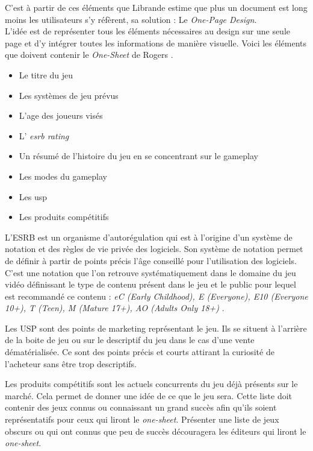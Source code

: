 C'est à partir de ces éléments que Librande \cite{onepage_librande} estime que plus un document est long moins les utilisateurs s'y réfèrent, sa solution : Le \emph{One-Page Design}.\\
L'idée est de représenter tous les éléments nécessaires au design sur une seule page et d'y intégrer toutes les informations de manière visuelle. 
Voici les éléments que doivent contenir le \emph{One-Sheet} de Rogers \cite{LevelUpRogers2014}.
\begin{itemize}
    \item Le titre du jeu
    \item Les systèmes de jeu prévus
    \item L'age des joueurs visés
\item L'\emph{ \gls{esrb} rating}
    \item Un résumé de l'histoire du jeu en se concentrant sur le gameplay
    \item Les modes du gameplay
    \item Les \gls{usp}
    \item Les produits compétitifs
\end{itemize}

L'ESRB est un organisme d'autorégulation qui est à l'origine d'un système de notation et des règles de vie privée des logiciels. Son système de notation permet de définir à partir de points précis l'âge conseillé pour l'utilisation des logiciels. C'est une notation que l'on retrouve systématiquement dans le domaine du jeu vidéo définissant le type de contenu présent dans le jeu et le public pour lequel est recommandé ce contenu : \emph{eC (Early Childhood), E (Everyone), E10 (Everyone 10+), T (Teen), M (Mature 17+), AO (Adults Only 18+)} .

Les USP sont des points de marketing représentant le jeu. Ils se situent à l'arrière de la boite de jeu ou sur le descriptif du jeu dans le cas d'une vente dématérialisée. Ce sont des points précis et courts attirant la curiosité de l'acheteur sans être trop descriptifs. 

Les produits compétitifs sont les actuels concurrents du jeu déjà présents sur le marché. Cela permet de donner une idée de ce que le jeu sera. Cette liste doit contenir des jeux connus ou connaissant un grand succès afin qu'ils soient représentatifs pour ceux qui liront le \emph{one-sheet}. Présenter une liste de jeux obscurs ou qui ont connus que peu de succès découragera les éditeurs qui liront le \emph{one-sheet}.

